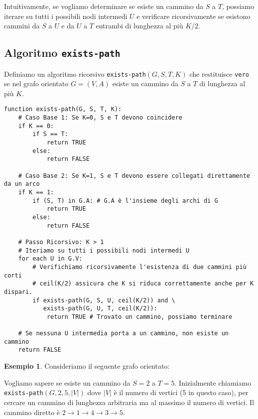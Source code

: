\documentclass[a4paper]{article}
\theoremstyle{definition} %
\newtheorem{example}{Esempio}
\begin{document}
Intuitivamente, se vogliamo determinare se esiste un cammino da $S$ a $T$, possiamo iterare su tutti i possibili nodi intermedi $U$ e verificare ricorsivamente se esistono cammini da $S$ a $U$ e da $U$ a $T$ entrambi di lunghezza al più $K/2$.

\subsection{Algoritmo \texttt{exists-path}}
Definiamo un algoritmo ricorsivo \texttt{exists-path}$(G, S, T, K)$ che restituisce \texttt{vero} se nel grafo orientato $G=(V,A)$ esiste un cammino da $S$ a $T$ di lunghezza al più $K$.

\begin{verbatim}
function exists-path(G, S, T, K):
    # Caso Base 1: Se K=0, S e T devono coincidere
    if K == 0:
        if S == T:
            return TRUE
        else:
            return FALSE

    # Caso Base 2: Se K=1, S e T devono essere collegati direttamente da un arco
    if K == 1:
        if (S, T) in G.A: # G.A è l'insieme degli archi di G
            return TRUE
        else:
            return FALSE
    
    # Passo Ricorsivo: K > 1
    # Iteriamo su tutti i possibili nodi intermedi U
    for each U in G.V:
        # Verifichiamo ricorsivamente l'esistenza di due cammini più corti
        # ceil(K/2) assicura che K si riduca correttamente anche per K dispari.
        if exists-path(G, S, U, ceil(K/2)) and \
           exists-path(G, U, T, ceil(K/2)):
            return TRUE # Trovato un cammino, possiamo terminare
            
    # Se nessuna U intermedia porta a un cammino, non esiste un cammino
    return FALSE
\end{verbatim}

\begin{example}
Consideriamo il seguente grafo orientato:
\begin{center}
\end{center}
Vogliamo sapere se esiste un cammino da $S=2$ a $T=5$. Inizialmente chiamiamo \texttt{exists-path}$(G, 2, 5, |V|)$ dove $|V|$ è il numero di vertici (5 in questo caso), per cercare un cammino di lunghezza arbitraria ma al massimo il numero di vertici.
Il cammino diretto è $2 \to 1 \to 4 \to 3 \to 5$.
\end{example}
\end{document}
